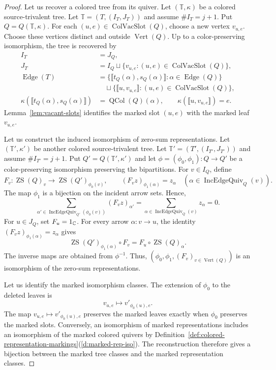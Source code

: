 \begin{proof}
 Let us recover a colored tree from its quiver.
Let $(\mathbb T,\kappa)$ be a colored source-trivalent tree.
Let $\mathbb T=(T,(I_T,J_T))$ and assume $\#I_T=j+1$.
Put $Q=Q(\mathbb T,\kappa)$.
For each $(u,e)\in\operatorname{ColVacSlot}(Q)$, choose a new vertex $v_{u,e}$.
Choose these vertices distinct and outside $\operatorname{Vert}(Q)$.
Up to a color-preserving isomorphism, the tree is recovered by
\[
 \begin{aligned}
 I_T&=J_Q,\\
 J_T&=I_Q\sqcup\{v_{u,e}:(u,e)\in\operatorname{ColVacSlot}(Q)\},\\
 \operatorname{Edge}(T)
 &=\{\llbracket t_Q(\alpha),s_Q(\alpha)\rrbracket:
       \alpha\in\operatorname{Edge}(Q)\}\\
 &\quad\sqcup\{\llbracket u,v_{u,e}\rrbracket:
       (u,e)\in\operatorname{ColVacSlot}(Q)\},\\
 \kappa(\llbracket t_Q(\alpha),s_Q(\alpha)\rrbracket)
 &=\operatorname{QCol}(Q)(\alpha),\qquad
 \kappa(\llbracket u,v_{u,e}\rrbracket)=e.
 \end{aligned}
\]
Lemma~\ref{lem:vacant-slots} identifies the marked slot $(u,e)$ with the marked leaf $v_{u,e}$.

Let us construct the induced isomorphism of zero-sum representations.
Let $(\mathbb T',\kappa')$ be another colored source-trivalent tree.
Let $\mathbb T'=(T',(I_{T'},J_{T'}))$ and assume $\#I_{T'}=j+1$.
Put $Q'=Q(\mathbb T',\kappa')$ and let
$\phi=(\phi_0,\phi_1):Q\to Q'$ be a color-preserving isomorphism preserving the bipartitions.
For $v\in I_Q$, define
\[
 F_v:\operatorname{ZS}(Q)_v\longrightarrow
        \operatorname{ZS}(Q')_{\phi_0(v)},\qquad
 (F_vz)_{\phi_1(\alpha)}=z_\alpha
 \quad(\alpha\in\operatorname{IncEdgeQuiv}_Q(v)).
\]
The map $\phi_1$ is a bijection on the incident arrow sets. Hence,
\[
 \sum_{\alpha'\in\operatorname{IncEdgeQuiv}_{Q'}(\phi_0(v))}
 (F_vz)_{\alpha'}
 =\sum_{\alpha\in\operatorname{IncEdgeQuiv}_Q(v)}z_\alpha=0.
\]
For $u\in J_Q$, set $F_u=1_{\mathbb C}$.
For every arrow $\alpha:v\to u$, the identity $(F_vz)_{\phi_1(\alpha)}=z_\alpha$ gives
\[
 \operatorname{ZS}(Q')_{\phi_1(\alpha)}\circ F_v
 =F_u\circ\operatorname{ZS}(Q)_\alpha.
\]
The inverse maps are obtained from $\phi^{-1}$. Thus,
$(\phi_0,\phi_1,(F_v)_{v\in\operatorname{Vert}(Q)})$ is an isomorphism of the zero-sum representations.

Let us identify the marked isomorphism classes.
The extension of $\phi_0$ to the deleted leaves is
\[
 v_{u,e}\longmapsto v'_{\phi_0(u),e}.
\]
The map $v_{u,e}\mapsto v'_{\phi_0(u),e}$ preserves the marked leaves exactly when $\phi_0$ preserves the marked slots.
Conversely, an isomorphism of marked representations includes an isomorphism of the marked colored quivers by Definition~\ref{def:colored-representation-markings}(\ref{d:marked-rep-iso}).
The reconstruction therefore gives a bijection between the marked tree classes and the marked representation classes.


\end{proof}
